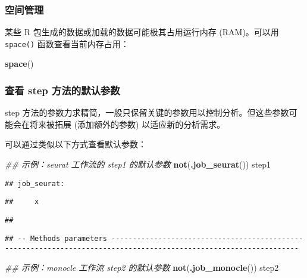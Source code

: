 \documentclass[
]{article}
\newenvironment{Shaded}{\begin{snugshade}}{\end{snugshade}}
\newcommand{\CommentTok}[1]{\textcolor[rgb]{0.56,0.35,0.01}{\textit{#1}}}
\newcommand{\KeywordTok}[1]{\textcolor[rgb]{0.13,0.29,0.53}{\textbf{#1}}}
\newcommand{\NormalTok}[1]{#1}
\begin{document}
\hypertarget{ux7a7aux95f4ux7ba1ux7406}{%
\subsubsection{空间管理}\label{ux7a7aux95f4ux7ba1ux7406}}

某些 R 包生成的数据或加载的数据可能极其占用运行内存 (RAM)。可以用 \texttt{space()} 函数查看当前内存占用：

\begin{Shaded}
\begin{Highlighting}[]
\KeywordTok{space}\NormalTok{()}
\end{Highlighting}
\end{Shaded}

\hypertarget{ux67e5ux770b-step-ux65b9ux6cd5ux7684ux9ed8ux8ba4ux53c2ux6570}{%
\subsubsection{查看 step 方法的默认参数}\label{ux67e5ux770b-step-ux65b9ux6cd5ux7684ux9ed8ux8ba4ux53c2ux6570}}

step 方法的参数力求精简，一般只保留关键的参数用以控制分析。但这些参数可能会在将来被拓展 (添加额外的参数) 以适应新的分析需求。

可以通过类似以下方式查看默认参数：

\begin{Shaded}
\begin{Highlighting}[]
\CommentTok{\#\# 示例：seurat 工作流的 step1 的默认参数}
\KeywordTok{not}\NormalTok{(}\KeywordTok{.job\_seurat}\NormalTok{())}
\NormalTok{step1}
\end{Highlighting}
\end{Shaded}

\begin{verbatim}
## job_seurat:
\end{verbatim}

\begin{verbatim}
##     x
\end{verbatim}

\begin{verbatim}
## 
\end{verbatim}

\begin{verbatim}
## -- Methods parameters ------------------------------------------------------------------------------------------------------------------
\end{verbatim}

\begin{Shaded}
\begin{Highlighting}[]
\CommentTok{\#\# 示例：monocle 工作流 step2 的默认参数}
\KeywordTok{not}\NormalTok{(}\KeywordTok{.job\_monocle}\NormalTok{())}
\NormalTok{step2}
\end{Highlighting}
\end{Shaded}
\end{document}
